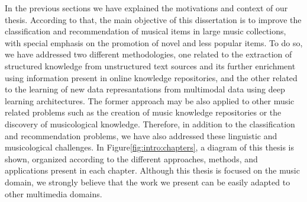 In the previous sections we have explained the motivations and context of our thesis. According to that, the main objective of this dissertation is to improve the classification and recommendation of musical items in large music collections, with special emphasis on the promotion of novel and less popular items. To do so, we have addressed two different methodologies, one related to the extraction of structured knowledge from unstructured text sources and its further enrichment using information present in online knowledge repositories, and the other related to the learning of new data represantations from multimodal data using deep learning architectures. The former approach may be also applied to other music related problems such as the creation of music knowledge repositories or the discovery of musicological knowledge. %
Therefore, in addition to the classification and recommendation problems, we have also addressed these linguistic and musicological challenges.
In Figure\ref{fig:intro:chapters}, a diagram of this thesis is shown, organized according to the different approaches, methods, and applications present in each chapter. Although this thesis is focused on the music domain, we strongly believe that the work we present can be easily adapted to other multimedia domains. 



